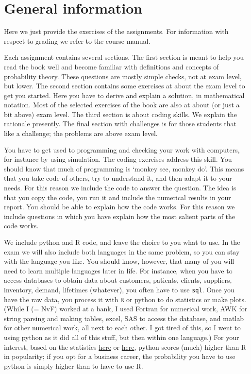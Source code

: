 \section*{General information}
\label{sec:orgb865fed}

Here we just provide the exercises of the assignments.  For information with respect to grading we refer to the  course manual.


Each assignment contains several sections.
The first section is meant to help you read the book well and become familiar with definitions and concepts of probability theory.
These questions are mostly simple checks, not at exam level, but lower.
The second section contains some exercises at about the exam level to get you started.
Here you have to derive and explain a solution, in mathematical notation.
Most of the selected exercises of the book are also at about (or just a bit above) exam level.
The third section is about coding skills.
We explain the rationale presently.
The final section with challenges is for those students that like a challenge; the problems are above exam level.


You have to get used to programming and checking your work with computers, for instance by using simulation.
The coding exercises address this skill.
You should know that much of programming is `monkey see, monkey do'.
This means that you take code of others, try to understand it, and then adapt it to your needs.
For this reason we include the code to answer the question.
The idea is that you copy the code, you  run it and include the numerical results in your report. You should be able to explain how the code works. For this reason we include questions in which you have explain how the most salient parts of the code works.

We include python and R code, and leave the choice to you what to use.
In the exam we will also include both languages in the same problem, so you can stay with the language you like.
You should know, however, that many of you will need to learn multiple languages later in life.
For instance, when you have to access databases to obtain data about customers, patients, clients, suppliers, inventory, demand, lifetimes (whatever), you often have to use \texttt{sql}.
Once you have the raw data, you process it with \texttt{R} or python to do statistics or make plots.
(While I (= NvF) worked at a bank, I used Fortran for numerical work, AWK for string parsing and making tables, excel, SAS to access the database, and matlab for other numerical work, all next to each other.
I got tired of this, so I went to using python as it did all of this stuff, but then within one language.)
For your interest, based on the statistics \href{https://www.tiobe.com/tiobe-index/}{here} or \href{https://www.northeastern.edu/graduate/blog/most-popular-programming-languages/}{here}, python scores (much) higher than R in popularity; if you opt for a business career, the probability you have to use python is simply higher than to have to use R.

